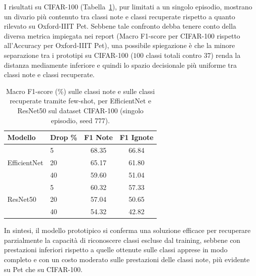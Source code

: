 \FloatBarrier

I risultati su CIFAR-100 (Tabella~\ref{tab:proto-cifar}), pur limitati a un singolo episodio, mostrano un divario più contenuto tra classi note e classi recuperate rispetto a quanto rilevato su Oxford-IIIT Pet. Sebbene tale confronto debba tenere conto della diversa metrica impiegata nei report (Macro F1-score per CIFAR-100 rispetto all'Accuracy per Oxford-IIIT Pet), una possibile spiegazione è che la minore separazione tra i prototipi su CIFAR-100 ($100$ classi totali contro $37$) renda la distanza mediamente inferiore e quindi lo spazio decisionale più uniforme tra classi note e classi recuperate.

\begin{table}[!htb]
    \centering
    \small
    \caption{Macro F1-score (\%) sulle classi note e sulle classi recuperate tramite few-shot, per EfficientNet e ResNet50 sul dataset CIFAR-100 (singolo episodio, seed 777).}
    \label{tab:proto-cifar}
    \begin{tabular}{llcc}
        \toprule
        \textbf{Modello} & \textbf{Drop \%} & \textbf{F1 Note} & \textbf{F1 Ignote} \\
        \midrule
        \multirow{3}{*}{EfficientNet} & 5  & 68.35 & 66.84 \\
                                       & 20 & 65.17 & 61.80 \\
                                       & 40 & 59.60 & 51.04 \\
        \midrule
        \multirow{3}{*}{ResNet50}     & 5  & 60.32 & 57.33 \\
                                       & 20 & 57.04 & 50.65 \\
                                       & 40 & 54.32 & 42.82 \\
        \bottomrule
    \end{tabular}
\end{table}

In sintesi, il modello prototipico si conferma una soluzione efficace per recuperare parzialmente la capacità di riconoscere classi escluse dal training, sebbene con prestazioni inferiori rispetto a quelle ottenute sulle classi apprese in modo completo e con un costo moderato sulle prestazioni delle classi note, più evidente su Pet che su CIFAR-100.
